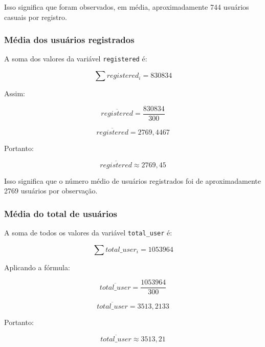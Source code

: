 \documentclass[12pt,a4paper]{article}
\begin{document}
Isso significa que foram observados, em média, aproximadamente 744 usuários
casuais por registro.

\subsubsection*{Média dos usuários registrados}

A soma dos valores da variável \texttt{registered} é:

\begin{equation}
\sum registered_i = 830834
\end{equation}

Assim:

\begin{equation}
\overline{registered} =
\frac{830834}{300}
\end{equation}

\begin{equation}
\overline{registered} =
2769{,}4467
\end{equation}

Portanto:

\begin{equation}
\boxed{\overline{registered} \approx 2769{,}45}
\end{equation}

Isso significa que o número médio de usuários registrados foi de
aproximadamente 2769 usuários por observação.

\subsubsection*{Média do total de usuários}

A soma de todos os valores da variável \texttt{total\_user} é:

\begin{equation}
\sum total\_user_i = 1053964
\end{equation}

Aplicando a fórmula:

\begin{equation}
\overline{total\_user} =
\frac{1053964}{300}
\end{equation}

\begin{equation}
\overline{total\_user} =
3513{,}2133
\end{equation}

Portanto:

\begin{equation}
\boxed{\overline{total\_user} \approx 3513{,}21}
\end{equation}
\end{document}
